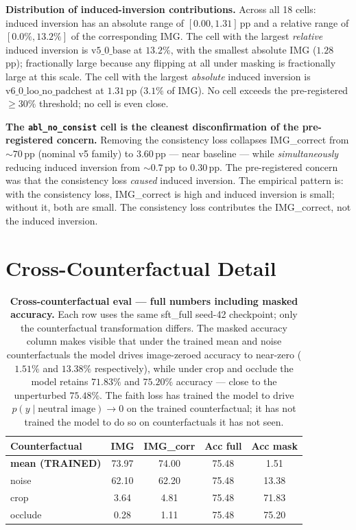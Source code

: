 \documentclass{article}
\begin{document}
\textbf{Distribution of induced-inversion contributions.} Across all 18
cells: induced inversion has an absolute range of
$[0.00, 1.31]$\,pp and a relative range of $[0.0\%, 13.2\%]$ of the
corresponding IMG. The cell with the largest \emph{relative} induced
inversion is $\mathrm{v5\_0\_base}$ at $13.2\%$, with the smallest
absolute IMG ($1.28$\,pp); fractionally large because any flipping at all
under masking is fractionally large at this scale. The cell with the
largest \emph{absolute} induced inversion is
$\mathrm{v6\_0\_loo\_no\_padchest}$ at $1.31$\,pp ($3.1\%$ of IMG). No
cell exceeds the pre-registered $\geq 30\%$ threshold; no cell is even
close.

\textbf{The \texttt{abl\_no\_consist} cell is the cleanest disconfirmation
of the pre-registered concern.} Removing the consistency loss collapses
IMG\_correct from $\sim 70$\,pp (nominal v5 family) to $3.60$\,pp ---
near baseline --- while \emph{simultaneously} reducing induced inversion
from $\sim 0.7$\,pp to $0.30$\,pp. The pre-registered concern was that
the consistency loss \emph{caused} induced inversion. The empirical
pattern is: with the consistency loss, IMG\_correct is high and induced
inversion is small; without it, both are small. The consistency loss
contributes the IMG\_correct, not the induced inversion.

\section{Cross-Counterfactual Detail}
\label{app:cross-cf}

\begin{table}[t]
\centering
\small
\caption{\textbf{Cross-counterfactual eval --- full numbers including
masked accuracy.} Each row uses the same sft\_full seed-42 checkpoint;
only the counterfactual transformation differs. The masked accuracy
column makes visible that under the trained mean and noise
counterfactuals the model drives image-zeroed accuracy to near-zero
($1.51\%$ and $13.38\%$ respectively), while under crop and occlude the
model retains $71.83\%$ and $75.20\%$ accuracy --- close to the
unperturbed $75.48\%$. The faith loss has trained the model to drive
$p(y\mid \text{neutral image}) \to 0$ on the trained counterfactual; it
has not trained the model to do so on counterfactuals it has not seen.}
\label{tab:cross-cf-full}
\setlength{\tabcolsep}{3.0pt}
\begin{tabular}{lcccc}
\toprule
\textbf{Counterfactual} & \textbf{IMG} & \textbf{IMG\_corr} & \textbf{Acc full} & \textbf{Acc mask}\\
\midrule
\textbf{mean (TRAINED)} & 73.97 & 74.00 & 75.48 & \phantom{0}1.51\\
noise                   & 62.10 & 62.20 & 75.48 & 13.38\\
crop                    & \phantom{0}3.64 & \phantom{0}4.81 & 75.48 & 71.83\\
occlude                 & \phantom{0}0.28 & \phantom{0}1.11 & 75.48 & 75.20\\
\bottomrule
\end{tabular}
\end{table}
\end{document}
